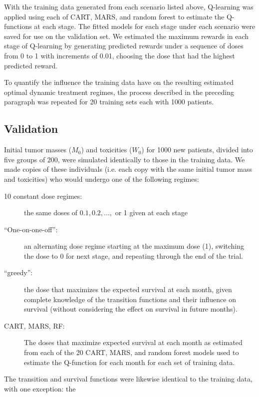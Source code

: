 \documentclass[12pt]{article}
\begin{document}
With the training data generated from each scenario listed above, Q-learning was applied using each of CART, MARS, and random forest to estimate the Q-functions at each stage. The fitted models for each stage under each scenario were saved for use on the validation set. We estimated the maximum rewards in each stage of Q-learning by generating predicted rewards under a sequence of doses from 0 to 1 with increments of 0.01, choosing the dose that had the highest predicted reward.

To quantify the influence the training data have on the resulting estimated optimal dynamic treatment regimes, the process described in the preceding paragraph was repeated for 20 training sets each with 1000 patients.


\subsection{Validation} %
\label{sub:validation}

Initial tumor masses ($M_{0}$) and toxicities ($W_{0}$) for 1000 new patients, divided into five groups of 200, were simulated identically to those in the training data. We made copies of these individuals (i.e. each copy with the same initial tumor mass and toxicities) who would undergo one of the following regimes:

\begin{description}
  \item [10 constant dose regimes:] the same doses of $0.1, 0.2, \ldots,$ or 1 given at each stage
  \item [``One-on-one-off'':] an alternating dose regime starting at the maximum dose (1), switching the dose to 0 for next stage, and repeating through the end of the trial.
  \item [``greedy'':] the dose that maximizes the expected survival at each month, given complete knowledge of the transition functions and their influence on survival (without considering the effect on survival in future months).
  \item [CART, MARS, RF:] The doses that maximize expected survival at each month as estimated from each of the 20 CART, MARS, and random forest models used to estimate the Q-function for each month for each set of training data.
\end{description}

The transition and survival functions were likewise identical to the training data, with one exception: the 
\end{document}
